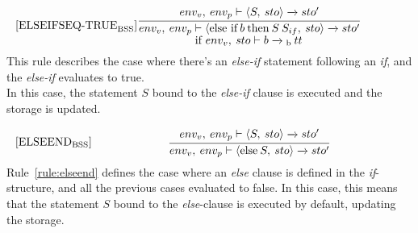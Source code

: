 \begin{equation}\label{rule:elseifseqtrue}
\begin{minipage}{.2\linewidth}
$[\text{ELSEIFSEQ-TRUE}_\text{BSS}]$
\end{minipage}
\begin{minipage}{.8\linewidth}
\centering
$\cfrac{env_v, \: env_p \vdash \langle S, \: sto \rangle \xrightarrow{} sto'}{env_v, \: env_p \vdash \langle \text{else if} \: b \: \text{then} \: S \: S_{if}, \: sto \rangle \xrightarrow{} sto'}$ 
\\
if $env_v, \: sto \vdash b \xrightarrow{}\textsubscript{b} \: tt$
\end{minipage}
\end{equation}
This rule describes the case where there's an \textit{else-if} statement following an \textit{if}, and the \textit{else-if} evaluates to true.\\
In this case, the statement $S$ bound to the \textit{else-if} clause is executed and the storage is updated.

\begin{equation}\label{rule:elseend}
\begin{minipage}{.2\linewidth}
$[\text{ELSEEND}_\text{BSS}]$
\end{minipage}
\begin{minipage}{.8\linewidth}
\centering
$\cfrac{env_v, \: env_p \vdash \langle S, \: sto \rangle \xrightarrow{} sto'}{env_v, \: env_p \vdash \langle \text{else} \: S, \: sto \rangle \xrightarrow{} sto'}$ 
\end{minipage}
\end{equation}
Rule~\ref{rule:elseend} defines the case where an \textit{else} clause is defined in the \textit{if}-structure, and all the previous cases evaluated to false. In this case, this means that the statement $S$ bound to the \textit{else}-clause is executed by default, updating the storage.

